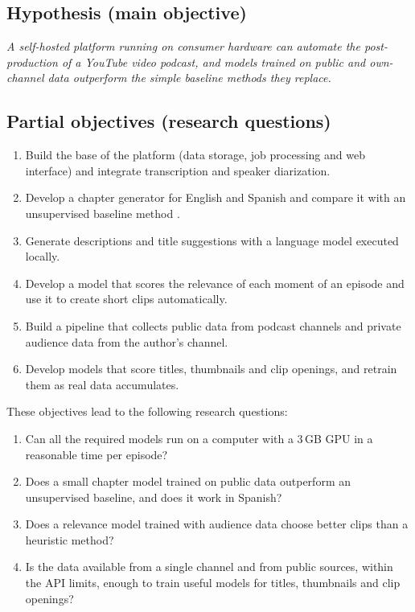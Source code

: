 \documentclass[ENG]{TFUOC}
\begin{document}
\subsection{Hypothesis (main objective)}

\textit{A self-hosted platform running on consumer hardware can automate the post-production of a YouTube video podcast, and models trained on public and own-channel data outperform the simple baseline methods they replace.}

\subsection{Partial objectives (research questions)}

\begin{enumerate}
\item[\textbf{O1}] Build the base of the platform (data storage, job processing and web interface) and integrate transcription and speaker diarization.
\item[\textbf{O2}] Develop a chapter generator for English and Spanish and compare it with an unsupervised baseline method \cite{hearst1997texttiling}.
\item[\textbf{O3}] Generate descriptions and title suggestions with a language model executed locally.
\item[\textbf{O4}] Develop a model that scores the relevance of each moment of an episode and use it to create short clips automatically.
\item[\textbf{O5}] Build a pipeline that collects public data from podcast channels and private audience data from the author's channel.
\item[\textbf{O6}] Develop models that score titles, thumbnails and clip openings, and retrain them as real data accumulates.
\end{enumerate}

These objectives lead to the following research questions:
\begin{enumerate}
\item[\textbf{RQ1}] Can all the required models run on a computer with a 3\,GB GPU in a reasonable time per episode?
\item[\textbf{RQ2}] Does a small chapter model trained on public data outperform an unsupervised baseline, and does it work in Spanish?
\item[\textbf{RQ3}] Does a relevance model trained with audience data choose better clips than a heuristic method?
\item[\textbf{RQ4}] Is the data available from a single channel and from public sources, within the API limits, enough to train useful models for titles, thumbnails and clip openings?
\end{enumerate}
\end{document}
